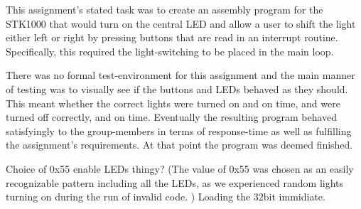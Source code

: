 This assignment’s stated task was to create an assembly program for the STK1000 that would turn on the central LED and allow a user to shift the light either left or right by pressing buttons that are read in an interrupt routine. Specifically, this required the light-switching to be placed in the main loop.

There was no formal test-environment for this assignment and the main manner of testing was to visually see if the buttons and LEDs behaved as they should. This meant whether the correct lights were turned on and on time, and were turned off correctly, and on time. Eventually the resulting program behaved satisfyingly to the group-members in terms of response-time as well as fulfilling the assignment’s requirements. At that point the program was deemed finished.


Choice of 0x55 enable LEDs thingy?
(The value of 0x55 was chosen as an easily recognizable pattern including all the LEDs, as we experienced random lights turning on during the run of invalid code. )
Loading the 32bit immidiate.
